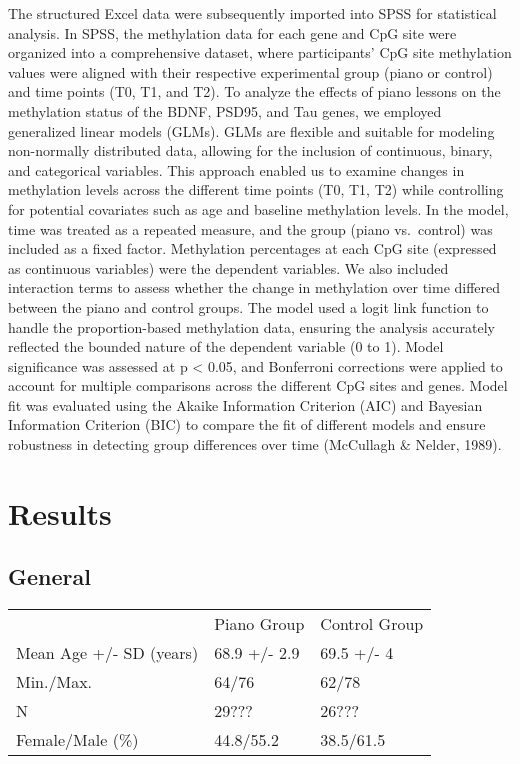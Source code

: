 \documentclass[
]{agujournal2019}
\begin{document}
The structured Excel data were subsequently imported into SPSS for
statistical analysis. In SPSS, the methylation data for each gene and
CpG site were organized into a comprehensive dataset, where
participants' CpG site methylation values were aligned with their
respective experimental group (piano or control) and time points (T0,
T1, and T2). To analyze the effects of piano lessons on the methylation
status of the BDNF, PSD95, and Tau genes, we employed generalized linear
models (GLMs). GLMs are flexible and suitable for modeling non-normally
distributed data, allowing for the inclusion of continuous, binary, and
categorical variables. This approach enabled us to examine changes in
methylation levels across the different time points (T0, T1, T2) while
controlling for potential covariates such as age and baseline
methylation levels. In the model, time was treated as a repeated
measure, and the group (piano vs.~control) was included as a fixed
factor. Methylation percentages at each CpG site (expressed as
continuous variables) were the dependent variables. We also included
interaction terms to assess whether the change in methylation over time
differed between the piano and control groups. The model used a logit
link function to handle the proportion-based methylation data, ensuring
the analysis accurately reflected the bounded nature of the dependent
variable (0 to 1). Model significance was assessed at p \textless{}
0.05, and Bonferroni corrections were applied to account for multiple
comparisons across the different CpG sites and genes. Model fit was
evaluated using the Akaike Information Criterion (AIC) and Bayesian
Information Criterion (BIC) to compare the fit of different models and
ensure robustness in detecting group differences over time (McCullagh \&
Nelder, 1989).

\section{Results}\label{results}

\subsection{General}\label{general}

\begin{longtable}[]{@{}lll@{}}
\toprule\noalign{}
\endhead
\bottomrule\noalign{}
\endlastfoot
~ & Piano Group & Control Group \\
Mean Age +/- SD (years) & 68.9 +/- 2.9 & 69.5 +/- 4 \\
Min./Max. & 64/76 & 62/78 \\
N & 29??? & 26??? \\
Female/Male (\%) & 44.8/55.2 & 38.5/61.5 \\
\end{longtable}
\end{document}
